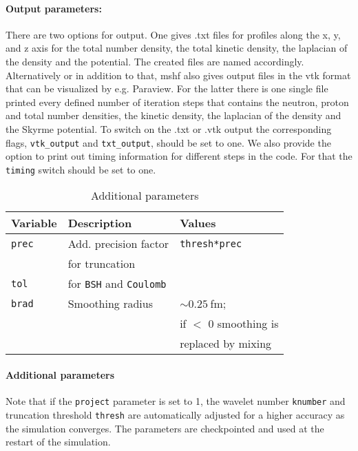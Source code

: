 \documentclass[4p]{elsarticle}
\begin{document}
\paragraph{Output parameters:} There are two options for output. One gives .txt files for profiles along the x, y, and z axis for the total number density, the total kinetic density, the laplacian of the density and the potential. The created files are named accordingly. Alternatively or in addition to that, {\sc mshf} also gives output files in the vtk format that can be visualized by e.g. Paraview. For the latter there is one single file printed every defined number of iteration steps that contains the neutron, proton and total number densities, the kinetic density, the laplacian of the density and the Skyrme potential. To switch on the .txt or .vtk output the corresponding flags, {\tt vtk\_output} and {\tt txt\_output}, should be set to one. We also provide the option to print out timing information for different steps in the code. For that the {\tt timing} switch should be set to one.   
\begin{table}
\caption{Additional parameters}
\begin{tabular*}{\columnwidth}{ l l l}
\hline
\hline
Variable & Description & Values\\
\hline
\texttt{prec}                                & Add. precision factor                                           &\texttt{thresh*prec}\\
                                                  & for truncation                                                                                     & \\
\texttt{tol}                                   & for \texttt{BSH} and \texttt{Coulomb}                     & \\
\texttt{brad}                                & Smoothing radius                                                         & $\sim 0.25\:$fm; \\
& & if $<$ 0 smoothing is\\
                                                 &                                                                                                           & replaced by mixing \\                                           

\hline
\hline
\end{tabular*}
\label{table5}
\end{table}
\paragraph{Additional parameters}
Note that if the \texttt{project} parameter is set to 1, the wavelet number \texttt{knumber} and truncation threshold \texttt{thresh} are automatically adjusted for a higher accuracy as the simulation converges. The parameters are checkpointed and used at the restart of the simulation.
\end{document}
